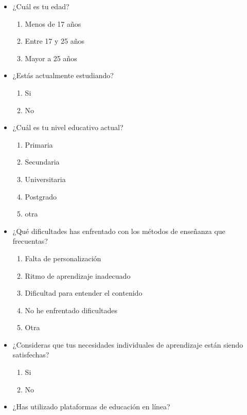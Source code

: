 \documentclass[
]{article}
\providecommand{\tightlist}{%
  \setlength{\itemsep}{0pt}\setlength{\parskip}{0pt}}
\begin{document}
\begin{itemize}
\tightlist
\item
  ¿Cuál es tu edad?

  \begin{enumerate}
  \def\labelenumi{\alph{enumi}.}
  \tightlist
  \item
    Menos de 17 años
  \item
    Entre 17 y 25 años
  \item
    Mayor a 25 años
  \end{enumerate}
\item
  ¿Estás actualmente estudiando?

  \begin{enumerate}
  \def\labelenumi{\alph{enumi}.}
  \tightlist
  \item
    Si
  \item
    No
  \end{enumerate}
\item
  ¿Cuál es tu nivel educativo actual?

  \begin{enumerate}
  \def\labelenumi{\alph{enumi}.}
  \tightlist
  \item
    Primaria
  \item
    Secundaria
  \item
    Universitaria
  \item
    Postgrado
  \item
    otra
  \end{enumerate}
\item
  ¿Qué dificultades has enfrentado con los métodos de enseñanza que
  frecuentas?

  \begin{enumerate}
  \def\labelenumi{\alph{enumi}.}
  \tightlist
  \item
    Falta de personalización
  \item
    Ritmo de aprendizaje inadecuado
  \item
    Dificultad para entender el contenido
  \item
    No he enfrentado dificultades
  \item
    Otra
  \end{enumerate}
\item
  ¿Consideras que tus necesidades individuales de aprendizaje están
  siendo satisfechas?

  \begin{enumerate}
  \def\labelenumi{\alph{enumi}.}
  \tightlist
  \item
    Si
  \item
    No
  \end{enumerate}
\item
  ¿Has utilizado plataformas de educación en línea?


\end{itemize}
\end{document}
